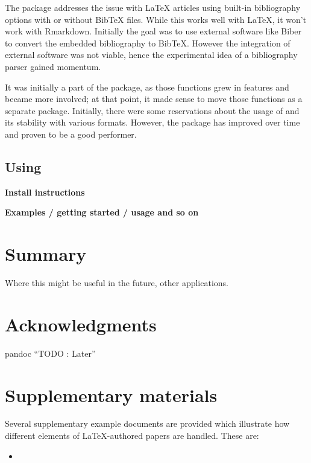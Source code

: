 The  package addresses the issue with LaTeX articles using built-in bibliography options with or without BibTeX files. While this works well with LaTeX, it won't work with Rmarkdown. Initially the goal was to use external software like Biber to convert the embedded bibliography to BibTeX.
However the integration of external software was not viable, hence the experimental idea of a bibliography parser gained momentum.

It was initially a part of the  package, as those functions grew in features and became more involved; at that point, it made sense to move those functions as a separate package. Initially, there were some reservations about
the usage of  and its stability with various formats. However, the package has improved over time and proven to be a good performer.

\hypertarget{using-1}{%
\subsection{\texorpdfstring{Using }{Using }}\label{using-1}}

\textbf{Install instructions}

\textbf{Examples / getting started / usage and so on}

\hypertarget{summary}{%
\section{Summary}\label{summary}}

Where this might be useful in the future, other applications.

\hypertarget{acknowledgments}{%
\section{Acknowledgments}\label{acknowledgments}}

pandoc
``TODO : Later''

\hypertarget{supplementary-materials}{%
\section{Supplementary materials}\label{supplementary-materials}}

Several supplementary example documents are provided which illustrate how different elements of LaTeX-authored papers are handled. These are:

\begin{itemize}
\tightlist
\item
\end{itemize}

